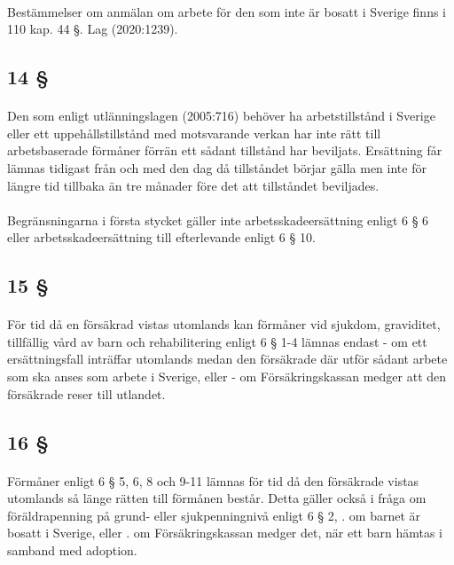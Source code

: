 \documentclass[a4paper,notitlepage,openany,10pt]{book}
\begin{document}
\paragraph*{}
Bestämmelser om anmälan om arbete för den som inte är bosatt i Sverige finns i 110 kap. 44 §.
Lag (2020:1239).
\subsection*{14 §}
\paragraph*{}
Den som enligt utlänningslagen (2005:716) behöver ha arbetstillstånd i Sverige eller ett uppehållstillstånd med motsvarande verkan har inte rätt till arbetsbaserade förmåner förrän ett sådant tillstånd har beviljats. Ersättning får lämnas tidigast från och med den dag då tillståndet börjar gälla men inte för längre tid tillbaka än tre månader före det att tillståndet beviljades.
\paragraph*{}
Begränsningarna i första stycket gäller inte arbetsskadeersättning enligt 6 § 6 eller arbetsskadeersättning till efterlevande enligt 6 § 10.
\subsection*{15 §}
\paragraph*{}
För tid då en försäkrad vistas utomlands kan förmåner vid sjukdom, graviditet, tillfällig vård av barn och rehabilitering enligt 6 § 1-4 lämnas endast
\newline - om ett ersättningsfall inträffar utomlands medan den försäkrade där utför sådant arbete som ska anses som arbete i Sverige, eller
\newline - om Försäkringskassan medger att den försäkrade reser till utlandet.
\subsection*{16 §}
\paragraph*{}
Förmåner enligt 6 § 5, 6, 8 och 9-11 lämnas för tid då den försäkrade vistas utomlands så länge rätten till förmånen består. Detta gäller också i fråga om föräldrapenning på grund- eller sjukpenningnivå enligt 6 § 2,
. om barnet är bosatt i Sverige, eller
. om Försäkringskassan medger det, när ett barn hämtas i samband med adoption.
\end{document}
